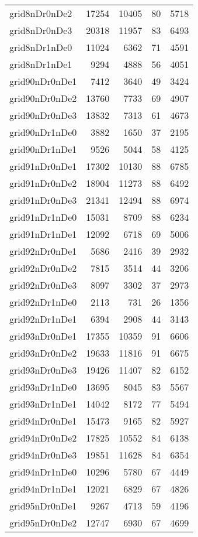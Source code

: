 \documentclass[../../../thesis.tex]{subfiles}
\begin{document}
\begin{longtable}{lrrrr}
grid8nDr0nDe2 & 17254 & 10405 & 80 & 5718 \\
grid8nDr0nDe3 & 20318 & 11957 & 83 & 6493 \\
grid8nDr1nDe0 & 11024 & 6362 & 71 & 4591 \\
grid8nDr1nDe1 & 9294 & 4888 & 56 & 4051 \\
grid90nDr0nDe1 & 7412 & 3640 & 49 & 3424 \\
grid90nDr0nDe2 & 13760 & 7733 & 69 & 4907 \\
grid90nDr0nDe3 & 13832 & 7313 & 61 & 4673 \\
grid90nDr1nDe0 & 3882 & 1650 & 37 & 2195 \\
grid90nDr1nDe1 & 9526 & 5044 & 58 & 4125 \\
grid91nDr0nDe1 & 17302 & 10130 & 88 & 6785 \\
grid91nDr0nDe2 & 18904 & 11273 & 88 & 6492 \\
grid91nDr0nDe3 & 21341 & 12494 & 88 & 6974 \\
grid91nDr1nDe0 & 15031 & 8709 & 88 & 6234 \\
grid91nDr1nDe1 & 12092 & 6718 & 69 & 5006 \\
grid92nDr0nDe1 & 5686 & 2416 & 39 & 2932 \\
grid92nDr0nDe2 & 7815 & 3514 & 44 & 3206 \\
grid92nDr0nDe3 & 8097 & 3302 & 37 & 2973 \\
grid92nDr1nDe0 & 2113 & 731 & 26 & 1356 \\
grid92nDr1nDe1 & 6394 & 2908 & 44 & 3143 \\
grid93nDr0nDe1 & 17355 & 10359 & 91 & 6606 \\
grid93nDr0nDe2 & 19633 & 11816 & 91 & 6675 \\
grid93nDr0nDe3 & 19426 & 11407 & 82 & 6152 \\
grid93nDr1nDe0 & 13695 & 8045 & 83 & 5567 \\
grid93nDr1nDe1 & 14042 & 8172 & 77 & 5494 \\
grid94nDr0nDe1 & 15473 & 9165 & 82 & 5927 \\
grid94nDr0nDe2 & 17825 & 10552 & 84 & 6138 \\
grid94nDr0nDe3 & 19851 & 11628 & 84 & 6354 \\
grid94nDr1nDe0 & 10296 & 5780 & 67 & 4449 \\
grid94nDr1nDe1 & 12021 & 6829 & 67 & 4826 \\
grid95nDr0nDe1 & 9267 & 4713 & 59 & 4196 \\
grid95nDr0nDe2 & 12747 & 6930 & 67 & 4699 \\

\end{longtable}
\end{document}
